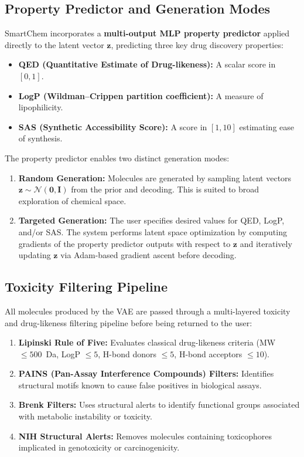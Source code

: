 \documentclass[12pt,a4paper]{report}
\begin{document}
\subsection{Property Predictor and Generation Modes}

SmartChem incorporates a \textbf{multi-output MLP property predictor} applied directly to the latent vector $\mathbf{z}$, predicting three key drug discovery properties:
\begin{itemize}
    \item \textbf{QED (Quantitative Estimate of Drug-likeness):} A scalar score in $[0, 1]$.
    \item \textbf{LogP (Wildman–Crippen partition coefficient):} A measure of lipophilicity.
    \item \textbf{SAS (Synthetic Accessibility Score):} A score in $[1, 10]$ estimating ease of synthesis.
\end{itemize}

The property predictor enables two distinct generation modes:
\begin{enumerate}
    \item \textbf{Random Generation:} Molecules are generated by sampling latent vectors $\mathbf{z} \sim \mathcal{N}(\mathbf{0}, \mathbf{I})$ from the prior and decoding. This is suited to broad exploration of chemical space.
    \item \textbf{Targeted Generation:} The user specifies desired values for QED, LogP, and/or SAS. The system performs latent space optimization by computing gradients of the property predictor outputs with respect to $\mathbf{z}$ and iteratively updating $\mathbf{z}$ via Adam-based gradient ascent before decoding.
\end{enumerate}

\subsection{Toxicity Filtering Pipeline}

All molecules produced by the VAE are passed through a multi-layered toxicity and drug-likeness filtering pipeline before being returned to the user:
\begin{enumerate}
    \item \textbf{Lipinski Rule of Five:} Evaluates classical drug-likeness criteria (MW $\leq 500$~Da, LogP $\leq 5$, H-bond donors $\leq 5$, H-bond acceptors $\leq 10$).
    \item \textbf{PAINS (Pan-Assay Interference Compounds) Filters:} Identifies structural motifs known to cause false positives in biological assays.
    \item \textbf{Brenk Filters:} Uses structural alerts to identify functional groups associated with metabolic instability or toxicity.
    \item \textbf{NIH Structural Alerts:} Removes molecules containing toxicophores implicated in genotoxicity or carcinogenicity.
\end{enumerate}
\end{document}
